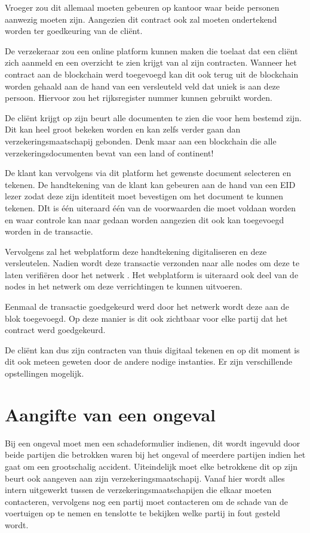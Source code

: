 Vroeger zou dit allemaal moeten gebeuren op kantoor waar beide personen aanwezig moeten zijn. Aangezien dit contract ook zal moeten ondertekend worden ter goedkeuring van de cliënt. 

De verzekeraar zou een online platform kunnen maken die toelaat dat een cliënt zich aanmeld en een overzicht te zien krijgt van al zijn contracten. Wanneer het contract aan de blockchain werd toegevoegd kan dit ook terug uit de blockchain worden gehaald aan de hand van een versleuteld veld dat uniek is aan deze persoon. Hiervoor zou het rijksregister nummer kunnen gebruikt worden. 

De cliënt krijgt op zijn beurt alle documenten te zien die voor hem bestemd zijn. Dit kan heel groot bekeken worden en kan zelfs verder gaan dan verzekeringsmaatschapij gebonden. Denk maar aan een blockchain die alle verzekeringsdocumenten bevat van een land of continent!

De klant kan vervolgens via dit platform het gewenste document selecteren en tekenen. De handtekening van de klant kan gebeuren aan de hand van een EID lezer zodat deze zijn identiteit moet bevestigen om het document te kunnen tekenen. DIt is één uiteraard één van de voorwaarden die moet voldaan worden en waar controle kan naar gedaan worden aangezien dit ook kan toegevoegd worden in de transactie. 

Vervolgens zal het webplatform deze handtekening digitaliseren en deze versleutelen. Nadien wordt deze transactie verzonden naar alle nodes om deze te laten verifiëren door het netwerk . Het webplatform is uiteraard ook deel van de nodes in het netwerk om deze verrichtingen te kunnen uitvoeren.

Eenmaal de transactie goedgekeurd werd door het netwerk wordt deze aan de blok toegevoegd. Op deze manier is dit ook zichtbaar voor elke partij dat het contract werd goedgekeurd. 

De cliënt kan dus zijn contracten van thuis digitaal tekenen en op dit moment is dit ook meteen geweten door de andere nodige instanties. Er zijn verschillende opstellingen mogelijk.

\section{Aangifte van een ongeval}
Bij een ongeval moet men een schadeformulier indienen, dit wordt ingevuld door beide partijen die betrokken waren bij het ongeval of meerdere partijen indien het gaat om een grootschalig accident. Uiteindelijk moet elke betrokkene dit op zijn beurt ook aangeven aan zijn verzekeringsmaatschapij. Vanaf hier wordt alles intern uitgewerkt tussen de verzekeringsmaatschapijen die elkaar moeten contacteren, vervolgens nog een partij moet contacteren om de schade van de voertuigen op te nemen en tenslotte te bekijken welke partij in fout gesteld wordt. 

